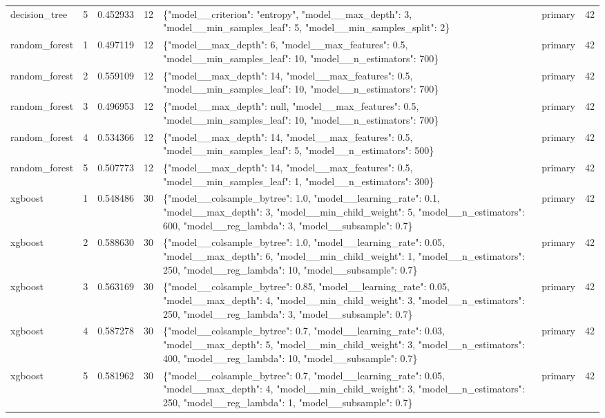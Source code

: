 \begin{tabular}{lrrrllr}
decision\_tree & 5 & 0.452933 & 12 & \{"model\_\_criterion": "entropy", "model\_\_max\_depth": 3, "model\_\_min\_samples\_leaf": 5, "model\_\_min\_samples\_split": 2\} & primary & 42 \\
random\_forest & 1 & 0.497119 & 12 & \{"model\_\_max\_depth": 6, "model\_\_max\_features": 0.5, "model\_\_min\_samples\_leaf": 10, "model\_\_n\_estimators": 700\} & primary & 42 \\
random\_forest & 2 & 0.559109 & 12 & \{"model\_\_max\_depth": 14, "model\_\_max\_features": 0.5, "model\_\_min\_samples\_leaf": 10, "model\_\_n\_estimators": 700\} & primary & 42 \\
random\_forest & 3 & 0.496953 & 12 & \{"model\_\_max\_depth": null, "model\_\_max\_features": 0.5, "model\_\_min\_samples\_leaf": 10, "model\_\_n\_estimators": 700\} & primary & 42 \\
random\_forest & 4 & 0.534366 & 12 & \{"model\_\_max\_depth": 14, "model\_\_max\_features": 0.5, "model\_\_min\_samples\_leaf": 5, "model\_\_n\_estimators": 500\} & primary & 42 \\
random\_forest & 5 & 0.507773 & 12 & \{"model\_\_max\_depth": 14, "model\_\_max\_features": 0.5, "model\_\_min\_samples\_leaf": 1, "model\_\_n\_estimators": 300\} & primary & 42 \\
xgboost & 1 & 0.548486 & 30 & \{"model\_\_colsample\_bytree": 1.0, "model\_\_learning\_rate": 0.1, "model\_\_max\_depth": 3, "model\_\_min\_child\_weight": 5, "model\_\_n\_estimators": 600, "model\_\_reg\_lambda": 3, "model\_\_subsample": 0.7\} & primary & 42 \\
xgboost & 2 & 0.588630 & 30 & \{"model\_\_colsample\_bytree": 1.0, "model\_\_learning\_rate": 0.05, "model\_\_max\_depth": 6, "model\_\_min\_child\_weight": 1, "model\_\_n\_estimators": 250, "model\_\_reg\_lambda": 10, "model\_\_subsample": 0.7\} & primary & 42 \\
xgboost & 3 & 0.563169 & 30 & \{"model\_\_colsample\_bytree": 0.85, "model\_\_learning\_rate": 0.05, "model\_\_max\_depth": 4, "model\_\_min\_child\_weight": 3, "model\_\_n\_estimators": 250, "model\_\_reg\_lambda": 3, "model\_\_subsample": 0.7\} & primary & 42 \\
xgboost & 4 & 0.587278 & 30 & \{"model\_\_colsample\_bytree": 0.7, "model\_\_learning\_rate": 0.03, "model\_\_max\_depth": 5, "model\_\_min\_child\_weight": 3, "model\_\_n\_estimators": 400, "model\_\_reg\_lambda": 10, "model\_\_subsample": 0.7\} & primary & 42 \\
xgboost & 5 & 0.581962 & 30 & \{"model\_\_colsample\_bytree": 0.7, "model\_\_learning\_rate": 0.05, "model\_\_max\_depth": 4, "model\_\_min\_child\_weight": 3, "model\_\_n\_estimators": 250, "model\_\_reg\_lambda": 1, "model\_\_subsample": 0.7\} & primary & 42 \\

\end{tabular}
